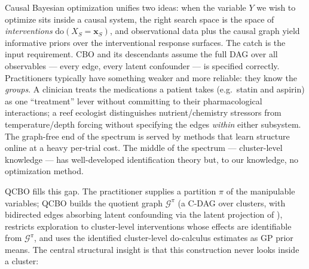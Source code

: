 \documentclass{article}
\renewcommand{\do}{\mathrm{do}}
\newcommand{\QCBO}{\textsc{QCBO}}
\newcommand{\Gq}{\mathcal{G}^{\pi}}
\begin{document}
Causal Bayesian optimization \citep{aglietti2020causal} unifies two ideas:
when the variable $Y$ we wish to optimize sits inside a causal system, the
right search space is the space of \emph{interventions}
$\do(X_S=\mathbf{x}_S)$, and observational data plus the causal graph yield
informative priors over the interventional response surfaces. The catch is
the input requirement. CBO and its descendants
\citep{aglietti2021dynamic,aglietti2023constrained,sussex2023model} assume
the full DAG over all observables --- every edge, every latent confounder
--- is specified correctly. Practitioners typically have something weaker
and more reliable: they know the \emph{groups}. A clinician treats the
medications a patient takes (e.g.\ statin and aspirin) as one ``treatment''
lever without committing to their pharmacological interactions; a reef
ecologist distinguishes nutrient/chemistry stressors from temperature/depth
forcing without specifying the edges \emph{within} either subsystem.
The graph-free end of the spectrum is served by methods that learn
structure online \citep{mukherjee2024gacbo,branchini2023causal} at a heavy
per-trial cost. The middle of the spectrum --- cluster-level knowledge ---
has well-developed identification theory
\citep{anand2023cdag,ferreira2025cdmg,wahl2024foundations} but, to our
knowledge, no optimization method.

\QCBO{} fills this gap. The practitioner supplies a partition $\pi$ of the
manipulable variables; \QCBO{} builds the quotient graph $\Gq$ (a C-DAG over
clusters, with bidirected edges absorbing latent confounding via the latent
projection of \citealp{lee2019latent}), restricts exploration to
cluster-level interventions whose effects are identifiable from $\Gq$, and
uses the identified cluster-level do-calculus estimates as GP prior means.
The central structural insight is that this construction never looks inside
a cluster:
\end{document}
